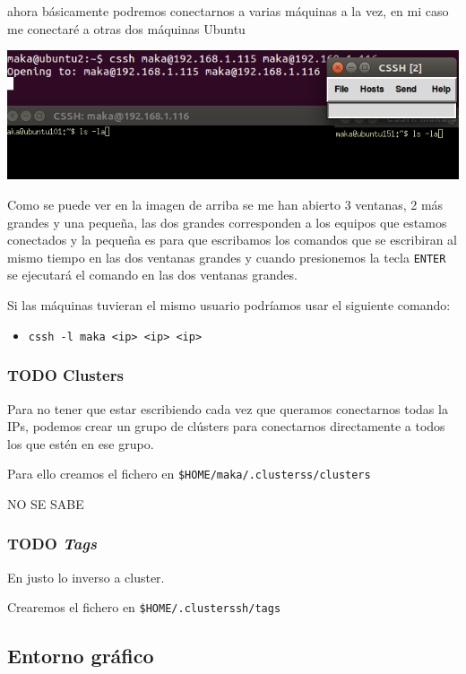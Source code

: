 \documentclass[11pt]{article}
\begin{document}
ahora básicamente podremos conectarnos a varias máquinas a la vez, en mi caso me conectaré a otras dos máquinas Ubuntu

\begin{center}
\includegraphics[width=.9\linewidth]{./media/cssh-2.png}
\end{center}

Como se puede ver en la imagen de arriba se me han abierto 3 ventanas, 2 más grandes y una pequeña, las dos grandes corresponden a los equipos que estamos conectados y la pequeña es para que
escribamos los comandos que se escribiran al mismo tiempo en las dos ventanas grandes y cuando presionemos la tecla \texttt{ENTER} se ejecutará el comando en las dos ventanas grandes.

Si las máquinas tuvieran el mismo usuario podríamos usar el siguiente comando:
\begin{itemize}
\item \texttt{cssh -l maka <ip> <ip> <ip>}
\end{itemize}

\subsubsection{{\bfseries\sffamily TODO} Clusters}
\label{sec:org200e192}
Para no tener que estar escribiendo cada vez que queramos conectarnos todas la IPs, podemos crear un grupo de clústers para conectarnos directamente a todos los que estén en ese grupo.

Para ello creamos el fichero en \texttt{\$HOME/maka/.clusterss/clusters}

NO SE SABE


\subsubsection{{\bfseries\sffamily TODO} \emph{Tags}}
\label{sec:orgd3830b6}
En justo lo inverso a cluster.

Crearemos el fichero en \texttt{\$HOME/.clusterssh/tags}
\subsection{Entorno gráfico}
\label{sec:org88ce837}
\end{document}
